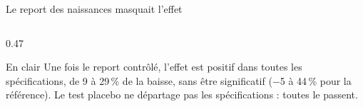 \documentclass[10pt,aspectratio=169]{beamer}
\begin{document}
\begin{frame}{Le report des naissances masquait l'effet}
\begin{columns}[T]
\begin{column}{0.47\textwidth}
      \begin{callout}[tdtenavy]{En clair}
        \scriptsize\RaggedRight Une fois le report contrôlé, l'effet est positif dans toutes les spécifications, de 9 à 29\,\% de la baisse, sans être significatif ($-$5 à 44\,\% pour la référence). Le test placebo ne départage pas les spécifications : toutes le passent.
      \end{callout}
    \end{column}
  \end{columns}
\end{frame}
\end{document}
